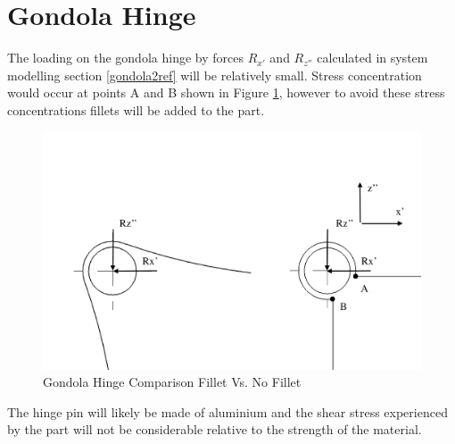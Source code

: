 \documentclass[../main.tex]{subfiles}
\begin{document}
\section{Gondola Hinge} \label{appendix:gondolaHinge}

The loading on the gondola hinge by forces $R_{x'}$ and $R_{z''}$ calculated in system modelling section \ref{gondola2ref} will be relatively small. Stress concentration would occur at points A and B shown in Figure \ref{fig:fillethinge}, however to avoid these stress concentrations fillets will be added to the part. 

\begin{figure}[H]
	\centering
	\includegraphics[width=1\textwidth]{img/gondola/filletHinge.PNG}
	\caption{Gondola Hinge Comparison Fillet Vs. No Fillet}
	\label{fig:fillethinge}
\end{figure}

The hinge pin will likely be made of aluminium and the shear stress experienced by the part will not be considerable relative to the strength of the material. 
\end{document}
